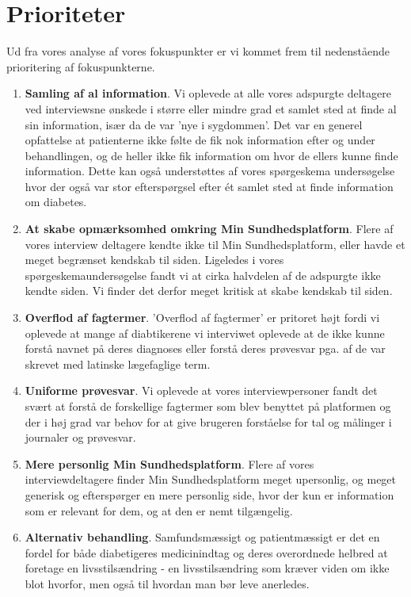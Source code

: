 \section{Prioriteter}
Ud fra vores analyse af vores fokuspunkter er vi kommet frem til nedenstående prioritering af fokuspunkterne.\\
\begin{enumerate}
	\item \textbf{Samling af al information}. Vi oplevede at alle vores adspurgte deltagere ved interviewsne ønskede i større eller mindre grad et samlet sted at finde al sin information, især da de var 'nye i sygdommen'. Det var en generel opfattelse at patienterne ikke følte de fik nok information efter og under behandlingen, og de heller ikke fik information om hvor de ellers kunne finde information. Dette kan også understøttes af vores spørgeskema undersøgelse hvor der også var stor efterspørgsel efter ét samlet sted at finde information om diabetes.
	\item \textbf{At skabe opmærksomhed omkring Min Sundhedsplatform}. Flere af vores interview deltagere kendte ikke til Min Sundhedsplatform, eller havde et meget begrænset kendskab til siden. Ligeledes i vores spørgeskemaundersøgelse fandt vi at cirka halvdelen af de adspurgte ikke kendte siden. Vi finder det derfor meget kritisk at skabe kendskab til siden.
	\item \textbf{Overflod af fagtermer}. 'Overflod af fagtermer' er pritoret højt fordi vi oplevede at mange af diabtikerene vi interviwet oplevede at de ikke kunne forstå navnet på deres diagnoses eller forstå deres prøvesvar pga. af de var skrevet med latinske lægefaglige term.
	\item \textbf{Uniforme prøvesvar}. Vi oplevede at vores interviewpersoner fandt det svært at forstå de forskellige fagtermer som blev benyttet på platformen og der i høj grad var behov for at give brugeren forståelse for tal og målinger i journaler og prøvesvar.
	\item \textbf{Mere personlig Min Sundhedsplatform}. Flere af vores interviewdeltagere finder Min Sundhedsplatform meget upersonlig, og meget generisk og efterspørger en mere personlig side, hvor der kun er information som er relevant for dem, og at den er nemt tilgængelig.
	\item \textbf{Alternativ behandling}. Samfundsmæssigt og patientmæssigt er det en fordel for både diabetigeres medicinindtag og deres overordnede helbred at foretage en livsstilsændring - en livsstilsændring som kræver viden om ikke blot hvorfor, men også til hvordan man bør leve anerledes.

\end{enumerate}
